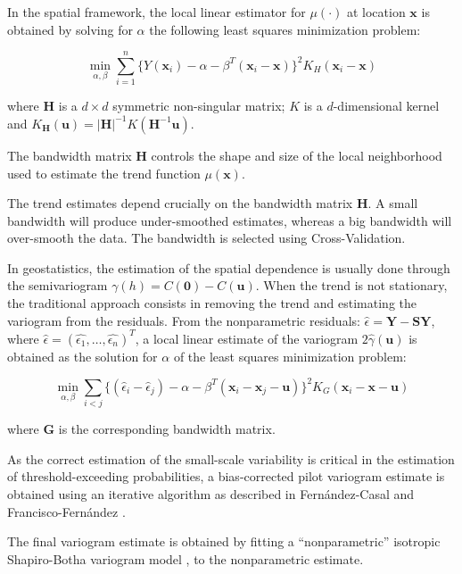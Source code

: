 
In the spatial framework, the local linear estimator for $\mu(\cdot)$ at location $\mathbf{x}$ is obtained by solving for $\alpha$ the following least squares minimization problem:

\[
    \min_{\alpha,\beta}\sum_{i=1}^{n}\{Y(\mathbf{x}_i)-\alpha-\beta^T(\mathbf{x}_i-\mathbf{x})\}^{2}K_{H}(\mathbf{x}_i-\mathbf{x})
\]

 where $\mathbf{H}$ is a $d \times d$ symmetric non-singular matrix; $K$ is a $d$-dimensional kernel and $K_{\mathbf{H}}(\mathbf{u})=|\mathbf{H}|^{-1}K(\mathbf{H}^{-1}\mathbf{u})$.

The bandwidth matrix $\mathbf{H}$ controls the shape and size of the local neighborhood used to estimate the trend function $\mu(\mathbf{x})$.


The trend estimates depend crucially on the bandwidth matrix $\mathbf{H}$. A small bandwidth will produce under-smoothed estimates, whereas a big bandwidth will over-smooth the data. The bandwidth is selected using Cross-Validation. 

In geostatistics, the estimation of the spatial dependence is usually done through the semivariogram $\gamma(h)= C(\mathbf{0}) - C(\mathbf{u})$.
When the trend is not stationary, the traditional approach consists in removing the trend and estimating the variogram from the residuals. From the nonparametric residuals: $\hat{\epsilon} = \mathbf{Y} - \mathbf{S}\mathbf{Y}$, where $\hat{\epsilon} = (\hat{\epsilon_1},\dots,\hat{\epsilon_n})^T$, a local linear estimate of the variogram $2\hat{\gamma}(\mathbf{u})$ is obtained as the solution for $\alpha$ of the least squares minimization problem:

\[
    \min_{\alpha,\beta}\sum_{i<j}\{(\hat{\epsilon}_i-\hat{\epsilon}_j)-\alpha-\beta^T(\mathbf{x}_i-\mathbf{x}_j-\mathbf{u})\}^{2}K_{G}(\mathbf{x}_i-\mathbf{x}-\mathbf{u})
\]

where $\mathbf{G}$ is the corresponding bandwidth matrix.

As the correct estimation of the small-scale variability is critical in the estimation of threshold-exceeding probabilities, a bias-corrected pilot variogram estimate is obtained using an iterative algorithm as described in Fernández-Casal and Francisco-Fernández \cite{casal}.

The final variogram estimate is obtained by fitting a “nonparametric” isotropic Shapiro-Botha variogram model \cite{shapiro}, to the nonparametric estimate.

